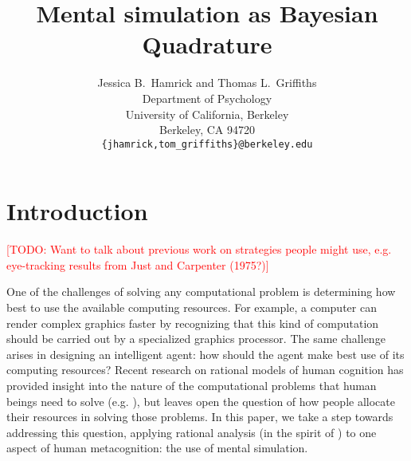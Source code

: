 \documentclass{article} %
\title{Mental simulation as Bayesian Quadrature}
\author{Jessica B.~Hamrick and Thomas L.~Griffiths\\
  Department of Psychology\\
  University of California, Berkeley\\
  Berkeley, CA 94720\\
  \texttt{\{jhamrick,tom\_griffiths\}@berkeley.edu}}
\newcommand{\TODO}[1]{\textcolor{red}{[TODO: #1]}}
\begin{document}
\maketitle



\section{Introduction}

\TODO{Want to talk about previous work on strategies people might use,
  e.g. eye-tracking results from Just and Carpenter (1975?)}



One of the challenges of solving any computational problem is
determining how best to use the available computing resources. For
example, a computer can render complex graphics faster by recognizing
that this kind of computation should be carried out by a specialized
graphics processor. The same challenge arises in designing an
intelligent agent: how should the agent make best use of its computing
resources? Recent research on rational models of human cognition has
provided insight into the nature of the computational problems that
human beings need to solve (e.g. \cite{something}), but leaves open
the question of how people allocate their resources in solving those
problems. In this paper, we take a step towards addressing this
question, applying rational analysis (in the spirit of
\cite{marr,anderson, shepard}) to one aspect of human metacognition:
the use of mental simulation.
\end{document}
